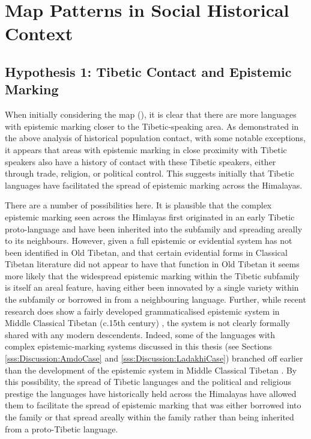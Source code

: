 \section{Map Patterns in Social Historical Context}\label{s:History:Correlations}
\subsection{Hypothesis 1: Tibetic Contact and Epistemic Marking}
When initially considering the map (), it is clear that there are more languages with epistemic marking closer to the Tibetic-speaking area. As demonstrated in the above analysis of historical population contact, with some notable exceptions, it appears that areas with epistemic marking in close proximity with Tibetic speakers also have a history of contact with these Tibetic speakers, either through trade, religion, or political control. This suggests initially that Tibetic languages have facilitated the spread of epistemic marking across the Himalayas. 

There are a number of possibilities here. It is plausible that the complex epistemic marking seen across the Himlayas first originated in an early Tibetic proto-language and have been inherited into the subfamily and spreading areally to its neighbours. However, given a full epistemic or evidential system has not been identified in Old Tibetan, and that certain evidential forms in Classical Tibetan literature did not appear to have that function in Old Tibetan \cite{Hill2014} it seems more likely that the widespread epistemic marking within the Tibetic subfamily is itself an areal feature, having either been innovated by a single variety within the subfamily or borrowed in from a neighbouring language. Further, while recent research does show a fairly developed grammaticalised epistemic system in Middle Classical Tibetan (c.15th century) \cite{Oisel2024}, the system is not clearly formally shared with any modern descendents. Indeed, some of the languages with complex epistemic-marking systems discussed in this thesis (see Sections \ref{sss:Discussion:AmdoCase} and \ref{sss:Discussion:LadakhiCase}) branched off earlier than the development of the epistemic system in Middle Classical Tibetan \cite{Bialek2018}. By this possibility, the spread of Tibetic languages and the political and religious prestige the languages have historically held across the Himalayas have allowed them to facilitate the spread of epistemic marking that was either borrowed into the family or that spread areally within the family rather than being inherited from a proto-Tibetic language.


